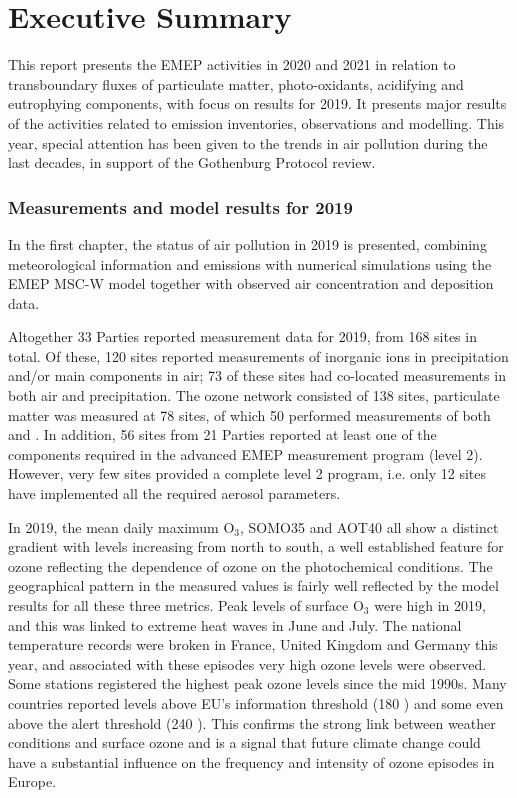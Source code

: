 \chapter*{Executive Summary}



This report presents the EMEP activities in 2020 and 2021 in relation to transboundary
fluxes of particulate matter, photo-oxidants, acidifying and
eutrophying components, with focus on results
for 2019. It presents major results of the activities related to emission inventories, observations and modelling. 
This year, special attention has been given to the trends in air pollution during the last decades, in support of the Gothenburg Protocol review.

\subsection*{Measurements and model results for 2019} %

In the first chapter, the status of air pollution in 2019 is presented, combining 
meteorological information and emissions with numerical simulations using the EMEP MSC-W model together with observed air concentration and deposition data.

Altogether 33 Parties reported measurement data for 2019, from 168 sites in total. 
Of these, 120 sites reported measurements of inorganic ions in precipitation and/or 
main components in air; 73 of these sites had co-located measurements in both air and 
precipitation. The ozone network consisted of 138 sites, particulate matter was measured at 
78 sites, of which 50 performed measurements of both \PM[10] and \PM[2.5]. 
In addition, 56 sites from 21 Parties reported at least one of the components required in the advanced EMEP measurement program (level 2). However, very few sites provided a complete level 2 program, i.e. only 12 sites have implemented all the required aerosol parameters. 

In 2019, the mean daily maximum O$_3$, SOMO35 and AOT40 all show a distinct gradient with levels increasing from north to south, a well established feature for ozone reflecting the dependence of ozone on the photochemical conditions. The geographical pattern in the measured values is fairly well reflected by the model results for all these three metrics. Peak levels of surface O$_3$ were high in 2019, and this was linked to extreme heat waves in June and July. The national temperature records were broken in France, United Kingdom and Germany this year, and associated with these episodes very high ozone levels were observed. Some stations registered the highest peak ozone levels since the mid 1990s. Many countries reported levels above EU's information threshold (180 \ug) and some even above the alert threshold (240 \ug). This confirms the strong link between weather conditions and surface ozone and is a signal that future climate change could have a substantial influence on the frequency and intensity of ozone episodes in Europe.

